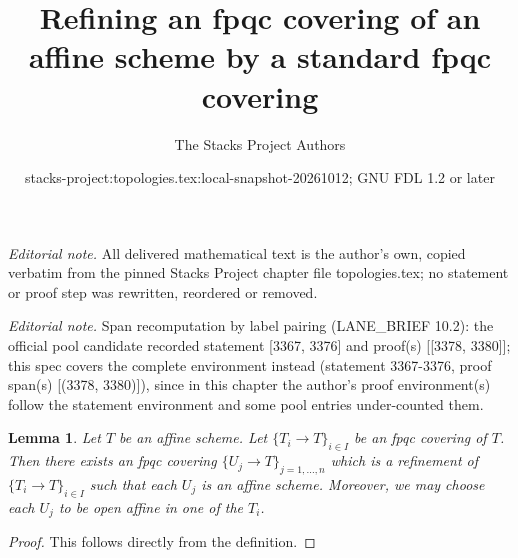 \documentclass[10pt,a4paper]{amsart}
\title{Refining an fpqc covering of an affine scheme by a standard fpqc covering}
\author{The Stacks Project Authors}
\date{stacks-project:topologies.tex:local-snapshot-20261012; GNU FDL 1.2 or later}
\theoremstyle{plain}
\newtheorem{lemma}[subsection]{Lemma}
\theoremstyle{definition}
\theoremstyle{remark}
\numberwithin{equation}{subsection}
\begin{document}
\maketitle
\noindent\textit{Editorial note.} All delivered mathematical text is the author's own, copied verbatim from the pinned Stacks Project chapter file topologies.tex; no statement or proof step was rewritten, reordered or removed.\par\medskip
\noindent\textit{Editorial note.} Span recomputation by label pairing (LANE\_BRIEF 10.2): the official pool candidate recorded statement [3367, 3376] and proof(s) [[3378, 3380]]; this spec covers the complete environment instead (statement 3367-3376, proof span(s) [(3378, 3380)]), since in this chapter the author's proof environment(s) follow the statement environment and some pool entries under-counted them.\par\medskip
\begin{lemma}
\label{lemma-fpqc-affine}
Let $T$ be an affine scheme.
Let $\{T_i \to T\}_{i \in I}$ be an fpqc covering of $T$.
Then there exists an fpqc covering
$\{U_j \to T\}_{j = 1, \ldots, n}$ which is a refinement
of $\{T_i \to T\}_{i \in I}$ such that each $U_j$ is an affine
scheme. Moreover, we may choose each $U_j$ to be open affine
in one of the $T_i$.
\end{lemma}

\begin{proof}
This follows directly from the definition.
\end{proof}
\end{document}
